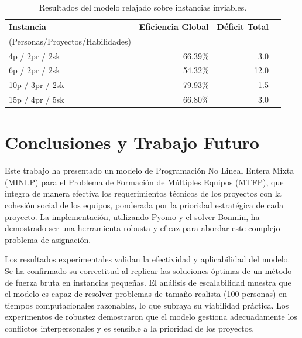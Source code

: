 \documentclass[conference]{IEEEtran}
\begin{document}
\begin{table}[htbp]
    \centering
    \caption{Resultados del modelo relajado sobre instancias inviables.}
    \label{tab:infeasible}
    \begin{tabularx}{\linewidth}{@{}lrrr@{}}
        \toprule
        \textbf{Instancia}               & \textbf{Eficiencia Global} & \textbf{Déficit Total} \\
        (Personas/Proyectos/Habilidades) &                            &                        \\
        \midrule
        4p / 2pr / 2sk                   & 66.39\%                    & 3.0                    \\
        6p / 2pr / 2sk                   & 54.32\%                    & 12.0                   \\
        10p / 3pr / 2sk                  & 79.93\%                    & 1.5                    \\
        15p / 4pr / 5sk                  & 66.80\%                    & 3.0                    \\
        \bottomrule
    \end{tabularx}
\end{table}

\section{Conclusiones y Trabajo Futuro}
Este trabajo ha presentado un modelo de Programación No Lineal Entera Mixta (MINLP) para el Problema de Formación de Múltiples Equipos (MTFP), que integra de manera efectiva los requerimientos técnicos de los proyectos con la cohesión social de los equipos, ponderada por la prioridad estratégica de cada proyecto. La implementación, utilizando Pyomo y el solver Bonmin, ha demostrado ser una herramienta robusta y eficaz para abordar este complejo problema de asignación.

Los resultados experimentales validan la efectividad y aplicabilidad del modelo. Se ha confirmado su correctitud al replicar las soluciones óptimas de un método de fuerza bruta en instancias pequeñas. El análisis de escalabilidad muestra que el modelo es capaz de resolver problemas de tamaño realista (100 personas) en tiempos computacionales razonables, lo que subraya su viabilidad práctica. Los experimentos de robustez demostraron que el modelo gestiona adecuadamente los conflictos interpersonales y es sensible a la prioridad de los proyectos.
\end{document}
